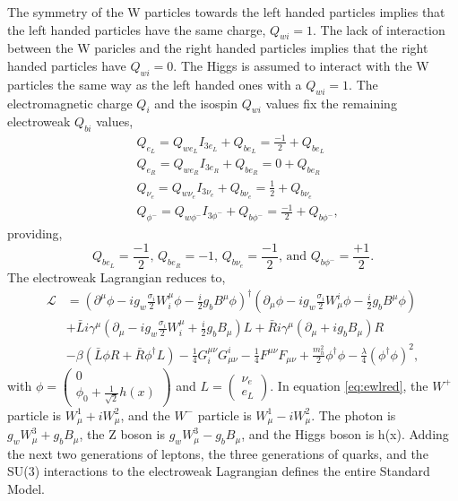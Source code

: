 \documentclass[12pt]{article}
\begin{document}
The symmetry of the W particles towards the left handed particles implies that the left handed particles have the same charge, $Q_{wi} = 1$. The lack of interaction between the W paricles and the right handed particles implies that the right handed particles have $Q_{wi} = 0$. The Higgs is assumed to interact with the W particles the same way as the left handed ones with a $Q_{wi} = 1$. The electromagnetic charge $Q_i$ and the isospin $Q_{wi}$ values fix the remaining electroweak $Q_{bi}$ values, 
\begin{equation}
\begin{split}
&Q_{e_L} = Q_{we_L}I_{3e_L} + Q_{be_L} = \frac{-1}{2} + Q_{be_L} \\
&Q_{e_R} = Q_{we_R}I_{3e_R} + Q_{be_R} = 0 + Q_{be_R} \\
&Q_{\nu_e} = Q_{w\nu_e}I_{3\nu_e} + Q_{b\nu_e} = \frac{1}{2} + Q_{b\nu_e} \\
&Q_{\phi^-} = Q_{w\phi^-}I_{3\phi^-} + Q_{b\phi^-} = \frac{-1}{2} + Q_{b\phi^-},
\end{split}
\end{equation}
providing, 
\begin{equation}
Q_{be_L} = \frac{-1}{2}\text{, } Q_{be_R} = -1 \text{, } Q_{b\nu_e} = \frac{-1}{2} \text{, and } Q_{b\phi^-} = \frac{+1}{2}.
\end{equation}
The electroweak Lagrangian reduces to,
\begin{equation}
\label{eq:ewlred}
\begin{split}
\mathcal{L} &= (\partial^\mu\phi - ig_{w}\frac{\sigma_i}{2}W_i^\mu\phi - \frac{i}{2}g_{b}B^\mu\phi)^\dagger
               (\partial_\mu\phi - ig_{w}\frac{\sigma_i}{2}W^i_\mu\phi - \frac{i}{2}g_{b}B^\mu\phi) \\ 
            &+ \bar{L}i\gamma^\mu(\partial_\mu - ig_{w}\frac{\sigma_i}{2}W_i^\mu + \frac{i}{2}g_{b}B_\mu)L + \bar{R}i\gamma^\mu(\partial_\mu + ig_{b}B_\mu)R \\
            &- \beta(\bar{L}\phi R + \bar{R}\phi^\dagger L) 
             - \frac{1}{4}G_i^{\mu\nu}G^i_{\mu\nu} -\frac{1}{4}F^{\mu\nu}F_{\mu\nu} + \frac{m_h^2}{2}\phi^\dagger\phi - \frac{\lambda}{4}(\phi^\dagger\phi)^2,
\end{split}
\end{equation}
with $\phi = \begin{pmatrix} 0 \\ \phi_0 + \frac{1}{\sqrt{2}}h(x) \end{pmatrix}$ and $L = \begin{pmatrix} \nu_e \\ e_L \end{pmatrix}$. In equation \ref{eq:ewlred}, the $W^+$ particle is $W^1_\mu+iW^2_\mu$, and the $W^-$ particle is $W^1_\mu - iW^2_\mu$. The photon is $g_{w}W^3_\mu + g_{b}B_\mu$, the Z boson is $g_{w}W^3_\mu - g_{b}B_\mu$, and the Higgs boson is h(x). Adding the next two generations of leptons, the three generations of quarks, and the SU(3) interactions to the electroweak Lagrangian defines the entire Standard Model.   
\end{document}
